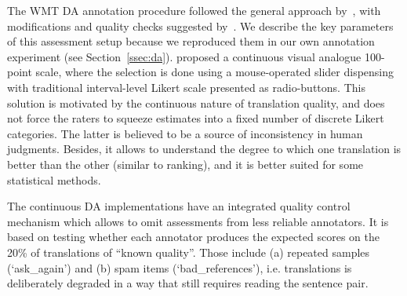 The WMT DA annotation procedure followed the general approach by~\citet{Graham2013}, with modifications and quality checks suggested by~\citet{Guzman2019}. 
We describe the key parameters of this assessment setup because we reproduced them in our own annotation experiment (see Section~\ref{ssec:da}). 
\citet{Graham2013} proposed a continuous visual analogue 100-point scale, where the selection is done using a mouse-operated slider dispensing with traditional interval-level Likert scale presented as radio-buttons. 
This solution is motivated by the continuous nature of translation quality, and does not force the raters to squeeze estimates into a fixed number of discrete Likert categories. The latter is believed to be a source of inconsistency in human judgments. 
Besides, it allows to understand the degree to which one translation is better than the other (similar to ranking), and it is better suited for some statistical methods. 

The continuous DA implementations have an integrated quality control mechanism which allows to omit assessments from less reliable annotators. It is based on testing whether each annotator produces the expected scores on the 20\% of translations of ``known quality''. Those include (a) repeated samples (`ask\_again') and (b) spam items (`bad\_references'), i.e. translations is deliberately degraded in a way that still requires reading the sentence pair. 

